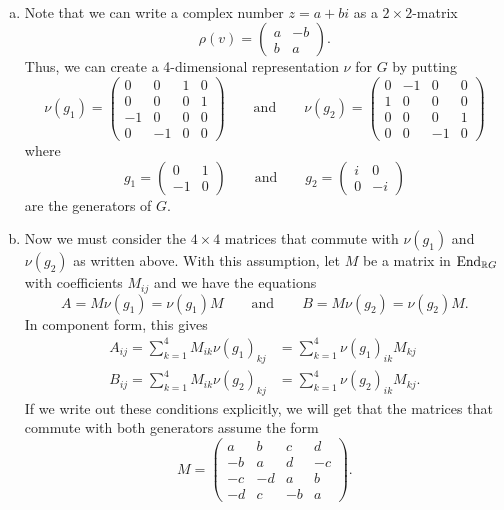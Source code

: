 \documentclass[leqno]{article}
\begin{document}
\begin{solution}~
\begin{enumerate}[(a)]
    \item Note that we can write a complex number $z=a+bi$ as a $2\times 2$-matrix
    \[
    \rho(v) = \begin{pmatrix} a & -b \\ b & a \end{pmatrix}.
    \]
    Thus, we can create a 4-dimensional representation $\nu$ for $G$ by putting
    \[
    \nu(g_1) = \begin{pmatrix} 0 & 0 & 1 & 0\\ 0 & 0 & 0 & 1 \\ -1 & 0 & 0 & 0\\ 0 & -1 & 0 & 0 \end{pmatrix} \qquad \textrm{and} \qquad \nu(g_2) = \begin{pmatrix} 0 & -1 & 0 & 0 \\ 1 & 0 & 0 & 0 \\ 0 & 0 & 0 & 1 \\ 0 & 0 & -1 & 0 \end{pmatrix}
    \]
    where
    \[
    g_1 = \begin{pmatrix} 0 & 1 \\ -1 & 0 \end{pmatrix} \qquad \textrm{and} \qquad g_2 = \begin{pmatrix} i & 0 \\ 0 & -i \end{pmatrix}
    \]
    are the generators of $G$.
    \item Now we must consider the $4\times 4$ matrices that commute with $\nu(g_1)$ and $\nu(g_2)$ as written above. With this assumption, let $M$ be a matrix in $\mathrm{End}_{\mathbb{R} G}$ with coefficients $M_{ij}$ and we have the equations
    \[
    A=M\nu(g_1) = \nu(g_1)M \qquad \textrm{and} \qquad B=M\nu(g_2)=\nu(g_2)M.
    \]
    In component form, this gives
    \begin{align*}
    A_{ij}=\sum_{k=1}^4 M_{ik}\nu(g_1)_{kj} &= \sum_{k=1}^4 \nu(g_1)_{ik} M_{kj}\\
    B_{ij}=\sum_{k=1}^4 M_{ik}\nu(g_2)_{kj} &= \sum_{k=1}^4 \nu(g_2)_{ik} M_{kj}.
    \end{align*}
    If we write out these conditions explicitly, we will get that the matrices that commute with both generators assume the form
    \[
    M=\begin{pmatrix} a & b & c & d \\ -b & a & d & -c \\ -c & -d & a & b \\ -d & c & -b & a \end{pmatrix}.
\]
\end{enumerate}
\end{solution}
\end{document}
